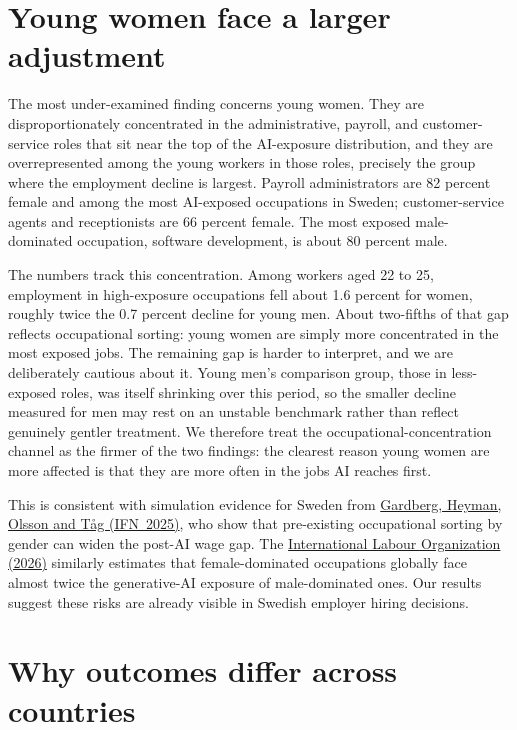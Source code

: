 \documentclass[12pt]{article}
\begin{document}
\section*{Young women face a larger adjustment}

The most under-examined finding concerns young women. They are disproportionately concentrated in the
administrative, payroll, and customer-service roles that sit near the top of the AI-exposure
distribution, and they are overrepresented among the young workers in those roles, precisely the
group where the employment decline is largest. Payroll administrators are 82 percent female and among
the most AI-exposed occupations in Sweden; customer-service agents and receptionists are 66 percent
female. The most exposed male-dominated occupation, software development, is about 80 percent male.

The numbers track this concentration. Among workers aged 22 to 25, employment in high-exposure
occupations fell about 1.6 percent for women, roughly twice the 0.7 percent decline for young men.
About two-fifths of that gap reflects occupational sorting: young women are simply more concentrated
in the most exposed jobs. The remaining gap is harder to interpret, and we are deliberately cautious
about it. Young men's comparison group, those in less-exposed roles, was itself shrinking over this
period, so the smaller decline measured for men may rest on an unstable benchmark rather than reflect
genuinely gentler treatment. We therefore treat the occupational-concentration channel as the firmer
of the two findings: the clearest reason young women are more affected is that they are more often in
the jobs AI reaches first.

This is consistent with simulation evidence for Sweden from
\href{https://www.ifn.se/en/publications/working-papers/2025/1534/}{Gardberg, Heyman, Olsson and
T\aa{}g (IFN~2025)}, who show that pre-existing occupational sorting by gender can widen the post-AI
wage gap. The
\href{https://www.ilo.org/resource/news/new-ilo-data-confirm-women-face-higher-workplace-risks-generative-ai-men}{International
Labour Organization (2026)} similarly estimates that female-dominated occupations globally face almost
twice the generative-AI exposure of male-dominated ones. Our results suggest these risks are already
visible in Swedish employer hiring decisions.

\section*{Why outcomes differ across countries}
\end{document}
